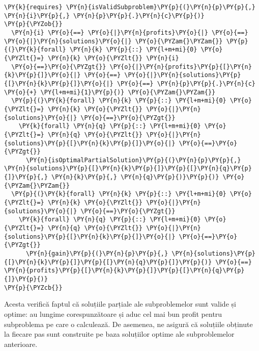 \begin{sloppypar}
\begin{enumerate}
\begin{Verbatim}[commandchars=\\\{\}]
  \PY{k}{requires} \PY{n}{isValidSubproblem}\PY{p}{(}\PY{n}{p}\PY{p}{,} \PY{n}{i}\PY{p}{,} \PY{n}{p}\PY{p}{.}\PY{n}{c}\PY{p}{)}
\PY{p}{\PYZob{}} 
  \PY{n}{i} \PY{o}{==} \PY{o}{|}\PY{n}{profits}\PY{o}{|} \PY{o}{==} \PY{o}{|}\PY{n}{solutions}\PY{o}{|} \PY{o}{\PYZam{}\PYZam{}} \PY{p}{(}\PY{k}{forall} \PY{n}{k} \PY{p}{::} \PY{l+m+mi}{0} \PY{o}{\PYZlt{}=} \PY{n}{k} \PY{o}{\PYZlt{}} \PY{n}{i} 
  \PY{o}{==}\PY{o}{\PYZgt{}} \PY{o}{|}\PY{n}{profits}\PY{p}{[}\PY{n}{k}\PY{p}{]}\PY{o}{|} \PY{o}{==} \PY{o}{|}\PY{n}{solutions}\PY{p}{[}\PY{n}{k}\PY{p}{]}\PY{o}{|} \PY{o}{==} \PY{n}{p}\PY{p}{.}\PY{n}{c} \PY{o}{+} \PY{l+m+mi}{1}\PY{p}{)} \PY{o}{\PYZam{}\PYZam{}} 
  \PY{p}{(}\PY{k}{forall} \PY{n}{k} \PY{p}{::} \PY{l+m+mi}{0} \PY{o}{\PYZlt{}=} \PY{n}{k} \PY{o}{\PYZlt{}} \PY{o}{|}\PY{n}{solutions}\PY{o}{|} \PY{o}{==}\PY{o}{\PYZgt{}} 
    \PY{k}{forall} \PY{n}{q} \PY{p}{::} \PY{l+m+mi}{0} \PY{o}{\PYZlt{}=} \PY{n}{q} \PY{o}{\PYZlt{}} \PY{o}{|}\PY{n}{solutions}\PY{p}{[}\PY{n}{k}\PY{p}{]}\PY{o}{|} \PY{o}{==}\PY{o}{\PYZgt{}} 
      \PY{n}{isOptimalPartialSolution}\PY{p}{(}\PY{n}{p}\PY{p}{,} \PY{n}{solutions}\PY{p}{[}\PY{n}{k}\PY{p}{]}\PY{p}{[}\PY{n}{q}\PY{p}{]}\PY{p}{,} \PY{n}{k}\PY{p}{,} \PY{n}{q}\PY{p}{)}\PY{p}{)} \PY{o}{\PYZam{}\PYZam{}} 
  \PY{p}{(}\PY{k}{forall} \PY{n}{k} \PY{p}{::} \PY{l+m+mi}{0} \PY{o}{\PYZlt{}=} \PY{n}{k} \PY{o}{\PYZlt{}} \PY{o}{|}\PY{n}{solutions}\PY{o}{|} \PY{o}{==}\PY{o}{\PYZgt{}} 
    \PY{k}{forall} \PY{n}{q} \PY{p}{::} \PY{l+m+mi}{0} \PY{o}{\PYZlt{}=} \PY{n}{q} \PY{o}{\PYZlt{}} \PY{o}{|}\PY{n}{solutions}\PY{p}{[}\PY{n}{k}\PY{p}{]}\PY{o}{|} \PY{o}{==}\PY{o}{\PYZgt{}} 
      \PY{n}{gain}\PY{p}{(}\PY{n}{p}\PY{p}{,} \PY{n}{solutions}\PY{p}{[}\PY{n}{k}\PY{p}{]}\PY{p}{[}\PY{n}{q}\PY{p}{]}\PY{p}{)} \PY{o}{==} \PY{n}{profits}\PY{p}{[}\PY{n}{k}\PY{p}{]}\PY{p}{[}\PY{n}{q}\PY{p}{]}\PY{p}{)}
\PY{p}{\PYZcb{}}
\end{Verbatim}
     Acesta verifică faptul că soluțiile parțiale ale subproblemelor sunt valide și optime: au lungime corespunzătoare și aduc cel mai bun profit pentru subproblema pe care o calculează. De asemenea, ne asigură că soluțiile obținute la fiecare pas sunt construite pe baza soluțiilor optime ale subproblemelor anterioare.
\end{enumerate}


\end{sloppypar}

